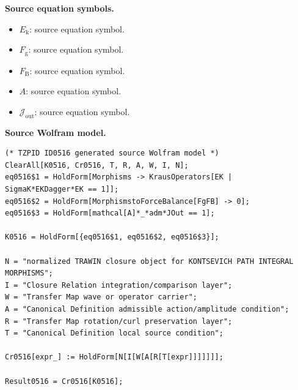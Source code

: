 \begin{minipage}[t]{0.49\linewidth}
\begingroup
\small
\raggedright
\textbf{Source equation symbols.}\par
\begin{itemize}[leftmargin=1.35em,itemsep=1pt,topsep=1pt,parsep=0pt]
    \item $E_{\mathrm{k}}$: source equation symbol.
    \item $F_{\mathrm{g}}$: source equation symbol.
    \item $F_{\mathrm{B}}$: source equation symbol.
    \item $A$: source equation symbol.
    \item $\mathcal{J}_{\mathrm{out}}$: source equation symbol.
\end{itemize}
\endgroup
\end{minipage}\hfill
\begin{minipage}[t]{0.47\linewidth}
\begingroup
\scriptsize
\raggedright
\textbf{Source Wolfram model.}\par
\begin{Verbatim}[fontsize=\tiny,breaklines=true,breakanywhere=true]
(* TZPID ID0516 generated source Wolfram model *)
ClearAll[K0516, Cr0516, T, R, A, W, I, N];
eq0516$1 = HoldForm[Morphisms -> KrausOperators[EK | SigmaK*EKDagger*EK == 1]];
eq0516$2 = HoldForm[MorphismstoForceBalance[FgFB] -> 0];
eq0516$3 = HoldForm[mathcal[A]*_*adm*JOut == 1];

K0516 = HoldForm[{eq0516$1, eq0516$2, eq0516$3}];

N = "normalized TRAWIN closure object for KONTSEVICH PATH INTEGRAL MORPHISMS";
I = "Closure Relation integration/comparison layer";
W = "Transfer Map wave or operator carrier";
A = "Canonical Definition admissible action/amplitude condition";
R = "Transfer Map rotation/curl preservation layer";
T = "Canonical Definition local source condition";

Cr0516[expr_] := HoldForm[N[I[W[A[R[T[expr]]]]]]];

Result0516 = Cr0516[K0516];
\end{Verbatim}
\endgroup
\end{minipage}

